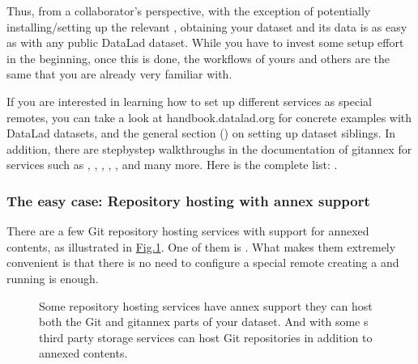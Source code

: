 \sphinxAtStartPar
Thus, from a collaborator’s perspective, with the exception of potentially
installing/setting up the relevant , obtaining your dataset and its
data is as easy as with any public DataLad dataset.
While you have to invest some setup effort in the beginning, once this
is done, the workflows of yours and others are the same that you are already
very familiar with.

\sphinxAtStartPar
If you are interested in learning how to set up different services as special remotes, you can take a look at handbook.datalad.org for concrete examples with DataLad datasets, and the general section {\hyperref[\detokenize{basics/101-139-hostingservices:share-hostingservice}]{}} () on setting up dataset siblings.
In addition, there are step\sphinxhyphen{}by\sphinxhyphen{}step walk\sphinxhyphen{}throughs in the documentation of git\sphinxhyphen{}annex for services such as , ,
,
,
, and many more.
Here is the complete list: .


\subsubsection{The easy case: Repository hosting with annex support}
\label{\detokenize{basics/101-138-sharethirdparty:the-easy-case-repository-hosting-with-annex-support}}
\sphinxAtStartPar
There are a few Git repository hosting services with support for annexed contents, as illustrated in \hyperref[\detokenize{basics/101-138-sharethirdparty:fig-specialpublishing}]{Fig.\@ \ref{\detokenize{basics/101-138-sharethirdparty:fig-specialpublishing}}}.
One of them is {\hyperref[\detokenize{glossary:term-GIN}]{}}.
What makes them extremely convenient is that there is no need to configure a special remote \textendash{} creating a {\hyperref[\detokenize{glossary:term-sibling}]{}} and running  is enough.

\begin{figure}[tbp]
\centering
\capstart

\noindent{}
\caption{Some repository hosting services have annex support \sphinxhyphen{} they can host both the Git and git\sphinxhyphen{}annex parts of your dataset. And with some {\hyperref[\detokenize{glossary:term-DataLad-extension}]{}}s third party storage services can host Git repositories in addition to annexed contents.}\label{\detokenize{basics/101-138-sharethirdparty:id6}}\label{\detokenize{basics/101-138-sharethirdparty:fig-specialpublishing}}\end{figure}


